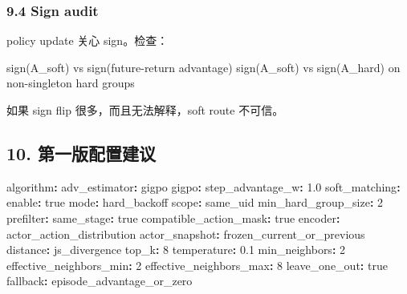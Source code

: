 \documentclass[
  10pt,
]{ctexart}
\newenvironment{Shaded}{}{}
\newcommand{\AttributeTok}[1]{\textcolor[rgb]{0.49,0.56,0.16}{#1}}
\newcommand{\CharTok}[1]{\textcolor[rgb]{0.25,0.44,0.63}{#1}}
\newcommand{\DecValTok}[1]{\textcolor[rgb]{0.25,0.63,0.44}{#1}}
\newcommand{\FloatTok}[1]{\textcolor[rgb]{0.25,0.63,0.44}{#1}}
\newcommand{\FunctionTok}[1]{\textcolor[rgb]{0.02,0.16,0.49}{#1}}
\newcommand{\KeywordTok}[1]{\textcolor[rgb]{0.00,0.44,0.13}{\textbf{#1}}}
\newcommand{\NormalTok}[1]{#1}
\begin{document}
\subsubsection{9.4 Sign audit}\label{sign-audit}

policy update 关心 sign。检查：

\begin{Shaded}
\begin{Highlighting}[]
\NormalTok{sign(A\_soft) vs sign(future{-}return advantage)}
\NormalTok{sign(A\_soft) vs sign(A\_hard) on non{-}singleton hard groups}
\end{Highlighting}
\end{Shaded}

如果 sign flip 很多，而且无法解释，soft route 不可信。

\subsection{10.
第一版配置建议}\label{ux7b2cux4e00ux7248ux914dux7f6eux5efaux8bae}

\begin{Shaded}
\begin{Highlighting}[]
\FunctionTok{algorithm}\KeywordTok{:}
\AttributeTok{  }\FunctionTok{adv\_estimator}\KeywordTok{:}\AttributeTok{ gigpo}
\AttributeTok{  }\FunctionTok{gigpo}\KeywordTok{:}
\AttributeTok{    }\FunctionTok{step\_advantage\_w}\KeywordTok{:}\AttributeTok{ }\FloatTok{1.0}
\AttributeTok{    }\FunctionTok{soft\_matching}\KeywordTok{:}
\AttributeTok{      }\FunctionTok{enable}\KeywordTok{:}\AttributeTok{ }\CharTok{true}
\AttributeTok{      }\FunctionTok{mode}\KeywordTok{:}\AttributeTok{ hard\_backoff}
\AttributeTok{      }\FunctionTok{scope}\KeywordTok{:}\AttributeTok{ same\_uid}
\AttributeTok{      }\FunctionTok{min\_hard\_group\_size}\KeywordTok{:}\AttributeTok{ }\DecValTok{2}
\AttributeTok{      }\FunctionTok{prefilter}\KeywordTok{:}
\AttributeTok{        }\FunctionTok{same\_stage}\KeywordTok{:}\AttributeTok{ }\CharTok{true}
\AttributeTok{        }\FunctionTok{compatible\_action\_mask}\KeywordTok{:}\AttributeTok{ }\CharTok{true}
\AttributeTok{      }\FunctionTok{encoder}\KeywordTok{:}\AttributeTok{ actor\_action\_distribution}
\AttributeTok{      }\FunctionTok{actor\_snapshot}\KeywordTok{:}\AttributeTok{ frozen\_current\_or\_previous}
\AttributeTok{      }\FunctionTok{distance}\KeywordTok{:}\AttributeTok{ js\_divergence}
\AttributeTok{      }\FunctionTok{top\_k}\KeywordTok{:}\AttributeTok{ }\DecValTok{8}
\AttributeTok{      }\FunctionTok{temperature}\KeywordTok{:}\AttributeTok{ }\FloatTok{0.1}
\AttributeTok{      }\FunctionTok{min\_neighbors}\KeywordTok{:}\AttributeTok{ }\DecValTok{2}
\AttributeTok{      }\FunctionTok{effective\_neighbors\_min}\KeywordTok{:}\AttributeTok{ }\DecValTok{2}
\AttributeTok{      }\FunctionTok{effective\_neighbors\_max}\KeywordTok{:}\AttributeTok{ }\DecValTok{8}
\AttributeTok{      }\FunctionTok{leave\_one\_out}\KeywordTok{:}\AttributeTok{ }\CharTok{true}
\AttributeTok{      }\FunctionTok{fallback}\KeywordTok{:}\AttributeTok{ episode\_advantage\_or\_zero}
\end{Highlighting}
\end{Shaded}
\end{document}

